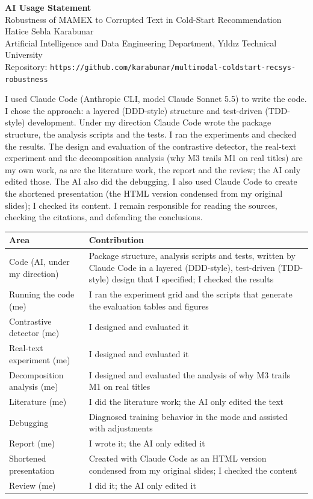 \documentclass[11pt,a4paper]{article}
\newcommand{\code}[1]{\texttt{\detokenize{#1}}}
\begin{document}
\begin{center}{\Large\bfseries AI Usage Statement}\\[4pt]
Robustness of MAMEX to Corrupted Text in Cold-Start Recommendation\\
Hatice Sebla Karabunar\\
Artificial Intelligence and Data Engineering Department, Y{\i}ld{\i}z Technical University\\
Repository: \texttt{https://github.com/karabunar/multimodal-coldstart-recsys-robustness}\end{center}
\vspace{6pt}

I used Claude Code (Anthropic CLI, model Claude Sonnet 5.5) to write the code. I chose the approach: a layered (DDD-style) structure and test-driven (TDD-style) development. Under my direction Claude Code wrote the package structure, the analysis scripts and the tests. I ran the experiments and checked the results. The design and evaluation of the contrastive detector, the real-text experiment and the decomposition analysis (why M3 trails M1 on real titles) are my own work, as are the literature work, the report and the review; the AI only edited those. The AI also did the debugging. I also used Claude Code to create the shortened presentation (the HTML version condensed from my original slides); I checked its content. I remain responsible for reading the sources, checking the citations, and defending the conclusions.

\begin{center}\small
\begin{tabularx}{\linewidth}{@{}p{3.6cm}X@{}}
\toprule
Area & Contribution \\
\midrule
Code (AI, under my direction) & Package structure, analysis scripts and tests, written by Claude Code in a layered (DDD-style), test-driven (TDD-style) design that I specified; I checked the results \\
Running the code (me) & I ran the experiment grid and the scripts that generate the evaluation tables and figures \\
Contrastive detector (me) & I designed and evaluated it \\
Real-text experiment (me) & I designed and evaluated it \\
Decomposition analysis (me) & I designed and evaluated the analysis of why M3 trails M1 on real titles \\
Literature (me) & I did the literature work; the AI only edited the text \\
Debugging & Diagnosed training behavior in the \code{improved} mode and assisted with adjustments \\
Report (me) & I wrote it; the AI only edited it \\
Shortened presentation & Created with Claude Code as an HTML version condensed from my original slides; I checked the content \\
Review (me) & I did it; the AI only edited it \\
\bottomrule
\end{tabularx}
\end{center}
\end{document}
